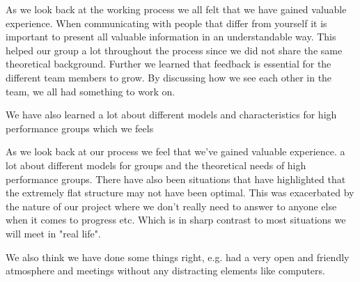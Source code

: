 As we look back at the working process we all felt that we have gained valuable experience. When communicating with people that differ from yourself it is important to present all valuable information in an understandable way. This helped our group a lot throughout the process since we did not share the same theoretical background. Further we learned that feedback is essential for the different team members to grow. By discussing how we see each other in the team, we all had something to work on.

We have also learned a lot about different models and characteristics for high performance groups which we feels

As we look back at our process we feel that we've gained valuable experience. a lot about different models for groups and the theoretical needs of high performance groups. There have also been situations that have highlighted that the extremely flat structure may not have been optimal. This was exacerbated by the nature of our project where we don't really need to answer to anyone else when it comes to progress etc. Which is in sharp contrast to most situations we will meet in "real life".

We also think we have done some things right, e.g. had a very open and friendly atmosphere and meetings without any distracting elements like computers. 

